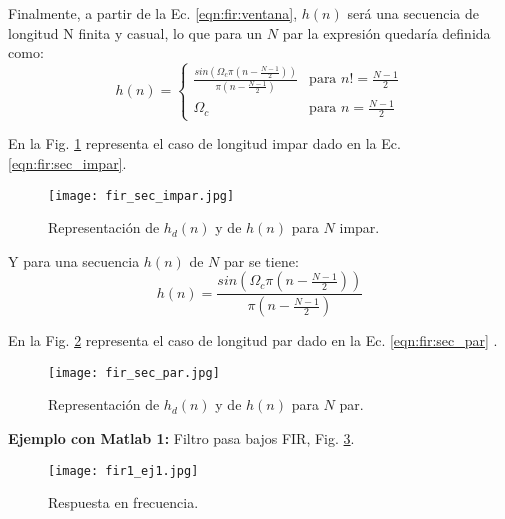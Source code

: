\documentclass[informe.tex]{subfiles}
\begin{document}
Finalmente, a partir de la Ec. \ref{eqn:fir:ventana}, $h(n)$ será una secuencia de longitud N finita y casual, lo que para un $N$ par la expresión quedaría definida como:
	\begin{equation}
		\label{eqn:fir:sec_impar}	
		h\left(n\right)=
			\begin{cases}
				\frac{ 
			     sin \left( \Omega_c \pi \left( n - \frac{N-1}
			                                            {2} \right) \right)}
				  {\pi \left( n - \frac{N-1}{2} \right)}	
				  & \mbox{para }n != \frac{N-1}{2}
			\\
			\Omega_c & \mbox{para }n=\frac{N-1}{2}
			\end{cases} 
	\end{equation}

En la Fig. \ref{fig:fir:sec_impar} representa el caso de longitud impar dado en la Ec. \ref{eqn:fir:sec_impar}.\newline
\begin{figure}[h]
		\centering
		\texttt{[image: fir\_sec\_impar.jpg]}
		\caption{Representación de $h_d(n)$ y de $h(n)$ para $N$ impar.}
		\label{fig:fir:sec_impar}
\end{figure}

Y para una secuencia $h(n)$ de $N$ par se tiene:
	\begin{equation}
		\label{eqn:fir:sec_par}	
		h\left(n\right)=
				\frac{ 
			     sin \left( \Omega_c \pi \left( n - \frac{N-1}
			                                            {2} \right) \right)}
				  {\pi \left( n - \frac{N-1}{2} \right)}	
	\end{equation}

En la Fig. \ref{fig:fir:sec_par} representa el caso de longitud par dado en la Ec. \ref{eqn:fir:sec_par} .\newline

	\begin{figure}[h]
		\centering
		\texttt{[image: fir\_sec\_par.jpg]}
		\caption{Representación de $h_d(n)$ y de $h(n)$ para $N$ par.}
		\label{fig:fir:sec_par}
	\end{figure}

\textbf{Ejemplo con Matlab 1:} Filtro pasa bajos FIR, Fig. \ref{fig:fir:freqz_ej1}.\newline    


	
	\begin{figure}[h]
		\centering
		\texttt{[image: fir1\_ej1.jpg]}
		\caption{Respuesta en frecuencia.}
		\label{fig:fir:freqz_ej1}
	\end{figure}	
\end{document}
